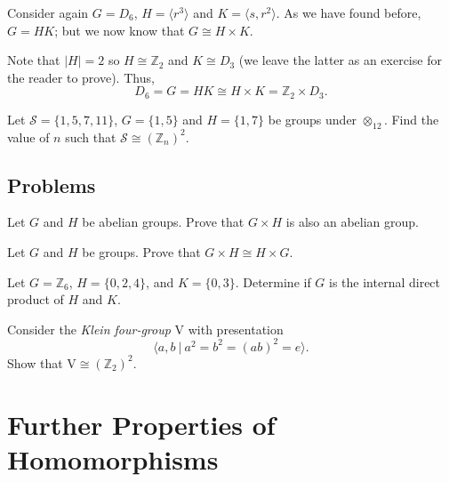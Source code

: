 \begin{example}
    Consider again $G = D_6$, $H = \langle r^3 \rangle$ and $K = \langle s, r^2 \rangle$. As we have found before, $G = HK$; but we now know that $G \cong H \times K$.

    Note that $|H| = 2$ so $H \cong \mathbb{Z}_2$ and $K \cong D_3$ (we leave the latter as an exercise for the reader to prove). Thus,
    \[
        D_6 = G = HK \cong H \times K = \mathbb{Z}_2 \times D_3.
    \]
\end{example}

\begin{exercise}
    Let $\mathcal{S} = \{1, 5, 7, 11\}$, $G = \{1, 5\}$ and $H = \{1, 7\}$ be groups under $\otimes_{12}$. Find the value of $n$ such that $\mathcal{S} \cong (\mathbb{Z}_n)^2$.
\end{exercise}



\section{Problems}
\begin{problem}\label{problem-external-direct-product-of-abelian-groups-is-abelian}
    Let $G$ and $H$ be abelian groups. Prove that $G \times H$ is also an abelian group.
\end{problem}

\begin{problem}
    Let $G$ and $H$ be groups. Prove that $G \times H \cong H \times G$.
\end{problem}

\begin{problem}
    Let $G = \mathbb{Z}_6$, $H = \{0, 2, 4\}$, and $K = \{0, 3\}$. Determine if $G$ is the internal direct product of $H$ and $K$.
\end{problem}

\begin{problem}
    Consider the \textit{Klein four-group} $\mathrm{V}$ with presentation
    \[
        \langle a, b \ | \ a^2 = b^2 = (ab)^2 = e \rangle.
    \]
    Show that $\mathrm{V} \cong (\mathbb{Z}_2)^2$.
\end{problem}

\chapter{Further Properties of Homomorphisms}
